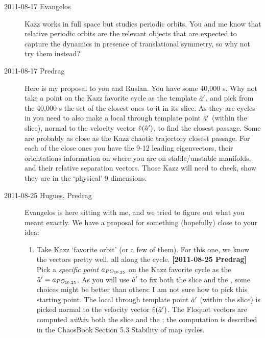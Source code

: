 \begin{description}
\item[2011-08-17 Evangelos]
  Kazz works in full space but studies
  periodic orbits. You and me know that relative periodic orbits are the
  relevant objects that are expected to capture the dynamics in presence
  of translational symmetry, so why not try them instead?

\item[2011-08-17 Predrag]
  Here is my proposal to you and Ruslan. You have some 40,000 \rpo s. Why
  not take a point on the Kazz favorite cycle
   as the template ${\hat{a}'}$, and pick from
  the 40,000 \rpo s the set of the closest ones to it in its slice. As they
  are cycles in {\pSRed} you need to also make a local {\PoincSec}
  through template point ${\hat{a}'}$ (within the slice), normal to the
  velocity vector $\hat{v}({\hat{a}'})$, to find the closest passage. Some are
  probably as close as the Kazz chaotic trajectory closest passage. For
  each of the close ones you have the 9-12 leading eigenvectors, their
  orientations information on where you are on stable/unstable manifolds,
  and their relative separation vectors. Those Kazz will need to check,
  show they are in the `physical' 9 dimensions.

\item[2011-08-25 Hugues, Predrag]
  Evangelos is here sitting with me, and we tried to figure out what you
  meant exactly. We have a proposal for something (hopefully) close to your
  idea:
  \begin{enumerate}
  \item Take Kazz `favorite orbit'  (or a few of them). For
    this one, we know the vectors pretty well, all along the cycle.
    {\bf [2011-08-25 Predrag]} Pick a \emph{specific point}
    $a_{PO_{10.25}}$ on the Kazz favorite cycle  as the
    \template\ ${\hat{a}'} = a_{PO_{10.25}}$. As you will use ${\hat{a}'}$
    to fix both the slice and the {\PoincSec}, some choices might
    be better than others: I am not sure how to pick this starting point.
    The local {\PoincSec} through template point ${\hat{a}'}$ (within
    the slice) is picked normal to the velocity vector
    $\hat{v}({\hat{a}'})$. The Floquet vectors are computed \emph{within}
    both the slice and the {\PoincSec}; the computation is
    described in the ChaosBook Section 5.3
     {Stability of
      \Poincare map cycles}.



\end{enumerate}
\end{description}

